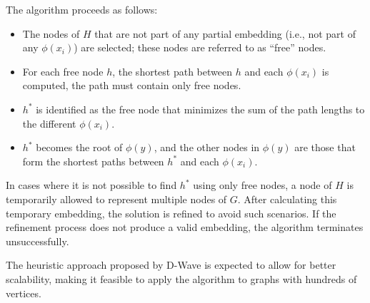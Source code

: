 The algorithm proceeds as follows:
\begin{itemize}
    \item The nodes of $H$ that are not part of any partial embedding (i.e., not part of any $\phi(x_i)$) are selected; these nodes are referred to as ``free'' nodes.
    \item For each free node $h$, the shortest path between $h$ and each $\phi(x_i)$ is computed, the path must contain only free nodes.
    \item $h^*$ is identified as the free node that minimizes the sum of the path lengths to the different $\phi(x_i)$.
    \item $h^*$ becomes the root of $\phi(y)$, and the other nodes in $\phi(y)$ are those that form the shortest paths between $h^*$ and each $\phi(x_i)$.
\end{itemize}

In cases where it is not possible to find $h^*$ using only free nodes, a node of $H$ is temporarily allowed to represent multiple nodes of $G$. 
After calculating this temporary embedding, the solution is refined to avoid such scenarios. If the refinement process does not produce a valid embedding, the algorithm terminates unsuccessfully.

The heuristic approach proposed by D-Wave is expected to allow for better scalability, making it feasible to apply the algorithm to graphs with hundreds of vertices.
